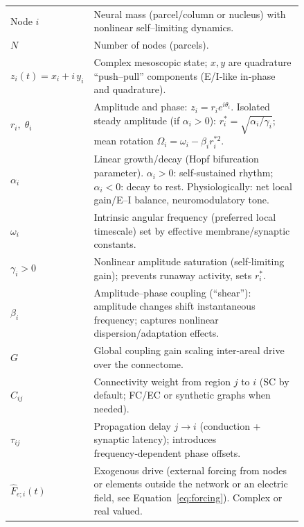 \documentclass[12pt]{article}
\numberwithin{equation}{section}
\begin{document}
\begin{tcolorbox}[
  colback=gray!5,
  colframe=slate,
  colbacktitle=softblue!25,
  coltitle=softblue!60!black,
  fonttitle=\bfseries\small,
  title={\small \textit{Stuart-Landau Network (Eq.~\ref{eq:sl_connectome})}\\ Whole-brain Simulations Parameters \& Physiological Meaning },
  boxrule=0.4pt, enhanced, sharp corners,
  left=4pt,right=4pt,top=3pt,bottom=3pt,
  boxsep=2pt, before skip=6pt, after skip=6pt
]
\scriptsize
\begin{tabular}{@{}l p{0.84\linewidth}@{}}
Node $i$ & Neural mass (parcel/column or nucleus) with nonlinear self–limiting dynamics.\\
\textbf{$N$} & Number of nodes (parcels).\\
\textbf{$z_i(t)=x_i+i\,y_i$} & Complex mesoscopic state; $x,y$ are quadrature “push–pull” components (E/I‑like in‑phase and quadrature).\\
\textbf{$r_i,\;\theta_i$} & Amplitude and phase: $z_i=r_i e^{i\theta_i}$. Isolated steady amplitude (if $\alpha_i>0$): $r_i^{*}=\sqrt{\alpha_i/\gamma_i}$; mean rotation $\Omega_i=\omega_i-\beta_i r_i^{*2}$.\\
\textbf{$\alpha_i$} & Linear growth/decay (Hopf bifurcation parameter). $\alpha_i>0$: self‑sustained rhythm; $\alpha_i<0$: decay to rest. Physiologically: net local gain/E–I balance, neuromodulatory tone.\\
\textbf{$\omega_i$} & Intrinsic angular frequency (preferred local timescale) set by effective membrane/synaptic constants.\\
\textbf{$\gamma_i>0$} & Nonlinear amplitude saturation (self‑limiting gain); prevents runaway activity, sets $r_i^{*}$.\\
\textbf{$\beta_i$} & Amplitude–phase coupling (“shear”): amplitude changes shift instantaneous frequency; captures nonlinear dispersion/adaptation effects.\\
\textbf{$G$} & Global coupling gain scaling inter‑areal drive over the connectome.\\
\textbf{$C_{ij}$} & Connectivity weight from region $j$ to $i$ (SC by default; FC/EC or synthetic graphs when needed).\\
\textbf{$\tau_{ij}$} & Propagation delay $j{\to}i$ (conduction + synaptic latency); introduces frequency‑dependent phase offsets.\\
\textbf{$\hat F_{e;i}(t)$}& Exogenous drive  (external forcing from nodes or elements outside the network or an electric field, see Equation~\ref{eq:forcing}). Complex or real valued.\\


\end{tabular}
\end{tcolorbox}
\end{document}
